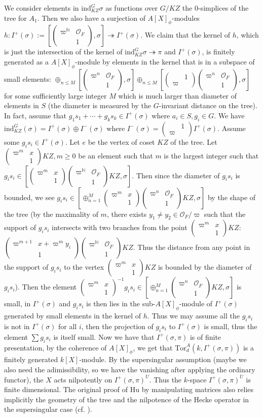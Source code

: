 \documentclass{amsart}
\newcommand{\N}{\mathbb{N}}
\newcommand{\cO}{\mathcal{O}}
\newcommand{\Tor}{\text{Tor}}
\newcommand{\ind}{\text{ind}}
\newcommand{\mtwo}[4]{\begin{pmatrix}
	#1&#2\\#3&#4
\end{pmatrix}}
\numberwithin{equation}{section}
\begin{document}
We consider elements in $\ind_{KZ}^G\sigma$ as functions over $G/KZ$ the $0$-simplices of the tree for $A_1$. Then we also have a surjection of $A[X]_{\phi}$-modules $h:I^{+}(\sigma):=[\mtwo{\varpi^{\N}}{\cO_{F}}{}{1},\sigma]\twoheadrightarrow I^{+}(\sigma)$. We claim that the kernel of $h$, which is just the intersection of the kernel of $\ind_{KZ}^G\sigma\twoheadrightarrow \pi$ and $I^+(\sigma)$, is finitely generated as a $A[X]_{\phi}$-module by elements in the kernel that is in a subspace of small elements: $\oplus_{n\leq M} [\mtwo{\varpi^{n}}{\cO_{F}}{}{1},\sigma]\oplus_{n\leq M} [\mtwo{}{1}{\varpi}{}\mtwo{\varpi^{n}}{\cO_{F}}{}{1},\sigma]$ for some sufficiently large integer $M$ which is much larger than diameter of elements in $S$ (the diameter is measured by the $G$-invariant distance on the tree). In fact, assume that $g_1s_1+\cdots+ g_ks_k\in I^+(\sigma)$ where $a_i\in S, g_i\in G$. We have $\ind_{KZ}^G(\sigma)=I^+(\sigma)\oplus I^-(\sigma)$ where $I^-(\sigma)=\mtwo{}{1}{\varpi}{}I^+(\sigma)$. Assume some $g_is_i\in I^+(\sigma)$. Let $e$ be the vertex of coset $KZ$ of the tree. Let $\mtwo{\varpi^m}{x}{}{1}KZ,m\geq 0$ be an element such that $m$ is the largest integer such that $g_is_i\in[\mtwo{\varpi^m}{x}{}{1}\mtwo{\varpi^{\N}}{\cO_F}{}{1}KZ,\sigma]$. Then since the diameter of $g_is_i$ is bounded, we see  $g_is_i\in[\oplus_{n=1}^M\mtwo{\varpi^m}{x}{}{1}\mtwo{\varpi^{n}}{\cO_F}{}{1}KZ,\sigma]$ by the shape of the tree (by the maximality of $m$, there exists $y_1\neq y_2\in \cO_F/\varpi$ such that the support of $g_is_i$ intersects with two branches from the point $\mtwo{\varpi^m}{x}{}{1}KZ$: $\mtwo{\varpi^{m+1}}{x+\varpi^my_i}{}{1}\mtwo{\varpi^{\N}}{\cO_F}{}{1}KZ$. Thus the distance from any point in the support of $g_is_i$ to the vertex $\mtwo{\varpi^m}{x}{}{1}KZ$ is bounded by the diameter of $g_is_i$). Then the element $\mtwo{\varpi^m}{x}{}{1}^{-1}g_is_i\in [\oplus_{n=1}^M\mtwo{\varpi^{n}}{\cO_F}{}{1}KZ,\sigma]$ is small, in $I^+(\sigma)$ and $g_is_i$ is then lies in the sub-$A[X]_{\phi}$-module of $I^+(\sigma)$ generated by small elements in the kernel of $h$. Thus we may assume all the $g_is_i$ is not in $I^+(\sigma)$ for all $i$, then the projection of $g_is_i$ to $I^+(\sigma)$ is small, thus the element $\sum g_is_i$ is itself small. Now we have that $I^+(\sigma,\pi)$ is of finite presentation, by the coherence of $A[X]_{\phi}$, we get that $\Tor_d^A(k,I^+(\sigma,\pi))$ is a finitely generated $k[X]$-module. By the supersingular assumption (maybe we also need the adimissibility, so we have the vanishing after applying the ordinary functor), the $X$ acts nilpotently on $I^+(\sigma,\pi)^{U}$. Thus the $k$-space $I^+(\sigma,\pi)^{U}$ is finite dimensional. The original proof of Hu by manipulating matrices also relies implicitly the geometry of the tree and the nilpotence of the Hecke operator in the supersingular case (cf. \cite[Prop. 4.11]{hu2012diagrammes}).\par
\end{document}

